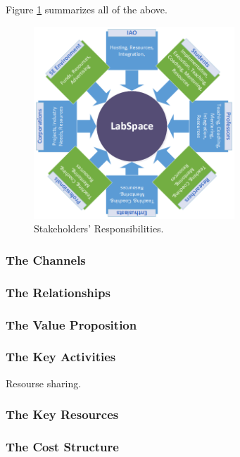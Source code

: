 \documentclass[a4paper, 11pt]{article}
\begin{document}
Figure \ref{fig:ls_responsibilities} summarizes all of the above.

\begin{figure}[h!]
  \begin{center}
    \includegraphics[width=285px,height=\textheight,keepaspectratio]{imagery/ls_stakeholders.png}
    \caption{Stakeholders' Responsibilities.}
    \label{fig:ls_responsibilities}
  \end{center}
\end{figure}


\subsubsection{The Channels}

\subsubsection{The Relationships}

\subsubsection{The Value Proposition}

\subsubsection{The Key Activities} \label{sec:bm_activities}
Resourse sharing.

\subsubsection{The Key Resources} \label{sec:bm_res}

\subsubsection{The Cost Structure}
\end{document}
